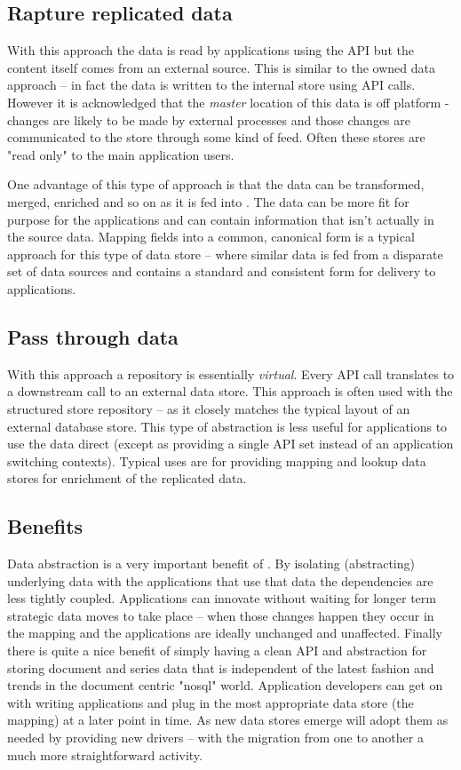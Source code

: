 \subsection{Rapture replicated data}
With this approach the data is read by applications using the \Rapture API but the content itself comes from an external source.
This is similar to the \Rapture owned data approach -- in fact the data is written to the internal store using API calls. However it
is acknowledged that the \emph{master} location of this data is off platform - changes are likely to be made by external processes
and those changes are communicated to the \Rapture store through some kind of feed. Often these stores are "read only" to the main
\Rapture application users.

One advantage of this type of approach is that the data can be transformed, merged, enriched and so on as it is fed into \Rapture. The data
can be more fit for purpose for the \Rapture applications and can contain information that isn't actually in the source data. Mapping fields into
a common, canonical form is a typical approach for this type of data store -- where similar data is fed from a disparate set of data sources and
\Rapture contains a standard and consistent form for delivery to applications.

\subsection{Pass through data}
With this approach a \Rapture repository is essentially \emph{virtual}. Every API call translates to a downstream call to an external data store.
This approach is often used with the structured store repository -- as it closely matches the typical layout of an external database store. This type
of abstraction is less useful for applications to use the data direct (except as providing a single API set instead of an application switching contexts). Typical uses
are for providing mapping and lookup data stores for enrichment of the \Rapture replicated data.

\subsection{Benefits}
Data abstraction is a very important benefit of \Rapture. By isolating (abstracting) underlying data with the applications that use that data the dependencies
are less tightly coupled. Applications can innovate without waiting for longer term strategic data moves to take place -- when those changes happen they occur in the mapping
and the applications are ideally unchanged and unaffected. Finally there is quite a nice benefit of simply having a clean API and abstraction for storing document and series
data that is independent of the latest fashion and trends in the document centric "nosql" world. Application developers can get on with writing applications and plug in the
most appropriate data store (the mapping) at a later point in time. As new data stores emerge \Rapture will adopt them as needed by providing new drivers -- with the migration
from one to another a much more straightforward activity.

